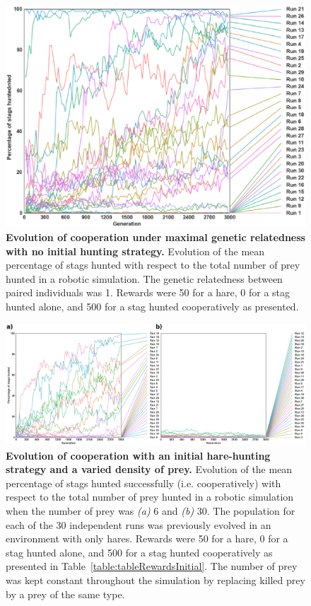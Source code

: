   \begin{figure}[h]
    \centering
      \includegraphics[scale = 0.5]{fig/ArticleBio1/S2_Fig.eps}
    \caption{\textbf{Evolution of cooperation under maximal genetic relatedness with no initial hunting strategy.}
    Evolution of the mean percentage of stags hunted with respect to the total number of prey hunted in a robotic simulation. The genetic relatedness between paired individuals was 1. Rewards were 50 for a hare, 0 for a stag hunted alone, and 500 for a stag hunted cooperatively as presented.}
    \label{fig:S2_Fig}
  \end{figure}

  \begin{figure}[h]
    \centerfloat
      \includegraphics[scale = 0.9]{fig/ArticleBio1/S3_Fig.eps}
    \caption{\textbf{Evolution of cooperation with an initial hare-hunting strategy and a varied density of prey.} 
    Evolution of the mean percentage of stags hunted successfully (i.e. cooperatively) with respect to the total number of prey hunted in a robotic simulation when the number of prey was {\em (a)} $6$ and {\em (b)} $30$. The population for each of the 30 independent runs was previously evolved in an environment with only hares. Rewards were 50 for a hare, 0 for a stag hunted alone, and 500 for a stag hunted cooperatively as presented in Table~\ref{table:tableRewardsInitial}. The number of prey was kept constant throughout the simulation by replacing killed prey by a prey of the same type.}
    \label{fig:S3_Fig}
  \end{figure}